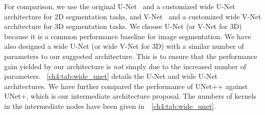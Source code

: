 For comparison, we use the original U-Net~\citep{ronneberger2015u} and a customized wide U-Net architecture for 2D segmentation tasks, and V-Net~\citep{milletari2016v} and a customized wide V-Net architecture for 3D segmentation tasks. We choose U-Net (or V-Net for 3D) because it is a common performance baseline for image segmentation. We have also designed a wide U-Net (or wide V-Net for 3D) with a similar number of parameters to our suggested architecture. This is to ensure that the performance gain yielded by our architecture is \textit{not} simply due to the increased number of parameters. \tableautorefname~\ref{ch4:tab:wide_unet} details the U-Net and wide U-Net architectures. We have further compared the performance of UNet++ against UNet+, which is our intermediate architecture proposal. The numbers of kernels in the intermediate nodes have been given in~\tableautorefname~\ref{ch4:tab:wide_unet}. 



